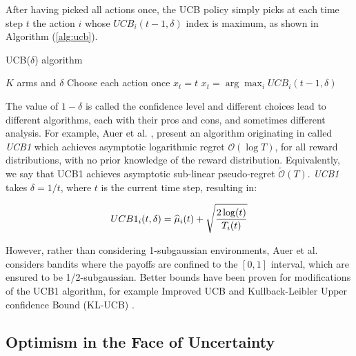 After having picked all actions once, the \gls{UCB} policy simply picks at each time step $t$ the action $i$ whose $UCB_i(t-1,\delta)$ index is maximum, as shown in Algorithm (\ref{alg:ucb}).

\begin{algorithm}[t]
	\caption{UCB($\delta$) algorithm}
	\label{alg:ucb}
	\begin{algorithmic}[1]
	 $K$ arms and $\delta$
	\State Choose each action once
			\State $x_{t} = t$
		\Else
			\State $x_t = \arg\max_i UCB_i(t-1, \delta)$
		\EndIf
	\EndFor
	\end{algorithmic}
\end{algorithm}


The value of $1-\delta$ is called the confidence level and different choices lead to different algorithms, each with their pros and cons, and sometimes different analysis. For example, Auer et al. \cite{auer2002finite}, present an algorithm originating in \cite{agrawal1995continuum} called \emph{UCB1} which achieves asymptotic logarithmic regret $\mathcal{O}(\log{T})$, for all reward distributions, with no prior knowledge of the reward distribution. Equivalently, we say that UCB1 achieves asymptotic sub-linear pseudo-regret $\widetilde{\mathcal{O}}(T)$. \emph{UCB1} takes $\delta=1/t$, where $t$ is the current time step, resulting in:

\begin{align}
UCB1_i(t, \delta) = \widehat{\mu}_i(t) + \sqrt{\frac{2\log(t)}{T_i(t)}}
\end{align}

However, rather than considering 1-subgaussian environments, Auer et al. \cite{auer2002finite} considers bandits where the payoffs are confined to the $[0,1]$ interval, which are ensured to be 1/2-subgaussian. Better bounds have been proven for modifications of the UCB1 algorithm, for example Improved UCB \cite{auer2010ucb} and Kullback-Leibler Upper confidence Bound (KL-UCB) \cite{garivier2011kl}.

\subsection{Optimism in the Face of Uncertainty}

